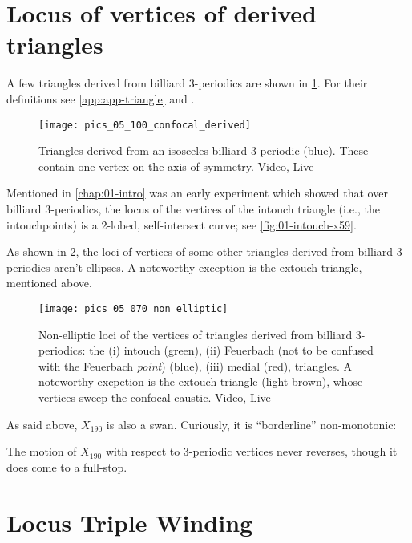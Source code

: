 \section{Locus of vertices of derived triangles}

A few triangles derived from billiard 3-periodics are shown in \cref{fig:05-derived-isosceles}. For their definitions see \cref{app:app-triangle} and \cite{mw}.

\begin{figure}
    \centering
    \texttt{[image: pics\_05\_100\_confocal\_derived]}
    \caption{Triangles derived from an isosceles billiard 3-periodic (blue). These contain one vertex on the axis of symmetry. \href{https://youtu.be/xyroRTEVNDc}{Video}, \href{https://bit.ly/3fyylD0}{Live}}
    \label{fig:05-derived-isosceles}
\end{figure}

Mentioned in \cref{chap:01-intro} was an early experiment which showed that over billiard 3-periodics, the locus of the vertices of the intouch triangle (i.e., the intouchpoints) is a 2-lobed, self-intersect curve; see \cref{fig:01-intouch-x59}.

As shown in \cref{fig:05-locus-x11-x100}, the loci of vertices of some other triangles derived from billiard 3-periodics aren't ellipses. A noteworthy exception is the extouch triangle, mentioned above.

\begin{figure}
    \centering
    \texttt{[image: pics\_05\_070\_non\_elliptic]}
    \caption{Non-elliptic loci of the vertices of triangles derived from billiard 3-periodics: the (i) intouch (green), (ii) Feuerbach (not to be confused with the Feuerbach {\em point}) (blue), (iii) medial (red), triangles. A noteworthy excpetion is the extouch triangle (light brown), whose vertices sweep the confocal caustic.
     \href{https://youtu.be/OGvCQbYqJyI}{Video}, \href{https://bit.ly/3orrSxQ}{Live}}
    \label{fig:05-locus-x11-x100}
\end{figure}

As said above, $X_{190}$ is also a swan. Curiously, it is ``borderline'' non-monotonic:

\begin{proposition}
The motion of $X_{190}$ with respect to 3-periodic vertices never reverses, though it does come to a full-stop.
\label{prop:05-x190}
\end{proposition}

\section{Locus Triple Winding}

